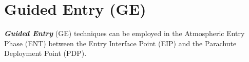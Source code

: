 
\section{Guided Entry (GE)}

    \textbf{\textit{Guided Entry}} (GE) techniques can be employed in the Atmospheric Entry Phase (ENT)
    between the Entry Interface Point (EIP) and the Parachute Deployment Point (PDP).



    